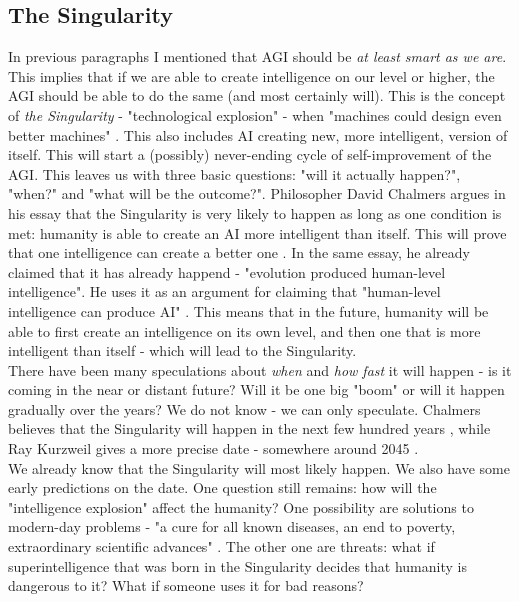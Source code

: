 \documentclass[12pt]{article}
\begin{document}
\subsection{The Singularity}
	In previous paragraphs I mentioned that AGI should be \emph{at least smart as we are}. This implies that if we are able to create intelligence on our level or higher, the AGI should be able to do the same (and most certainly will). This is the concept of \emph{the Singularity} - "technological explosion" - when "machines could design even better machines" \cite{singularity:1}. This also includes AI creating new, more intelligent, version of itself. This will start a (possibly) never-ending cycle of self-improvement of the AGI. This leaves us with three basic questions: "will it actually happen?", "when?" and "what will be the outcome?". Philosopher David Chalmers argues in his essay that the Singularity is very likely to happen as long as one condition is met: humanity is able to create an AI more intelligent than itself. This will prove that one intelligence can create a better one \cite{singularity:3}. In the same essay, he already claimed that it has already happend - "evolution produced human-level intelligence". He uses it as an argument for claiming that "human-level intelligence can produce AI" \cite{singularity:3}. This means that in the future, humanity will be able to first create an intelligence on its own level, and then one that is more intelligent than itself - which will lead to the Singularity. 
	\\There have been many speculations about \emph{when} and \emph{how fast} it will happen - is it coming in the near or distant future? Will it be one big "boom" or will it happen gradually over the years? We do not know - we can only speculate. Chalmers believes that the Singularity will happen in the next few hundred years \cite{singularity:2}\cite{singularity:3}, while Ray Kurzweil gives a more precise date - somewhere around 2045 \cite{singularity:2}\cite{singularity:4}.
	\\We already know that the Singularity will most likely happen. We also have some early predictions on the date. One question still remains: how will the "intelligence explosion" affect the humanity? One possibility are solutions to modern-day problems - "a cure for all known diseases, an end to poverty, extraordinary scientific advances" \cite{singularity:3}. The other one are threats: what if superintelligence that was born in the Singularity decides that humanity is dangerous to it? What if someone uses it for bad reasons? 
\end{document}
